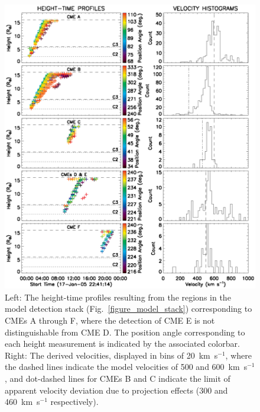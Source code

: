 \documentclass[preprint2]{aastex}
\begin{document}
\begin{figure}[!p]
\centerline{\includegraphics[scale=0.85, clip=true, trim=0 0 0 0]{images/figure_model_histograms.eps}}
\caption{Left: The height-time profiles resulting from the regions in the model detection stack (Fig.~\ref{figure_model_stack}) corresponding to CMEs A through F, where the detection of CME E is not distinguishable from CME D. The position angle corresponding to each height measurement is indicated by the associated colorbar. Right: The derived velocities, displayed in bins of 20~km~s$^{-1}$, where the dashed lines indicate the model velocities of 500 and 600~km~s$^{-1}$, and dot-dashed lines for CMEs B and C indicate the limit of apparent velocity deviation due to projection effects (300 and 460~km~s$^{-1}$ respectively).}
\label{figure_model_histograms}
\end{figure}
\end{document}
